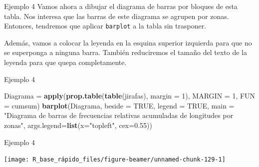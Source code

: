\documentclass[
  ignorenonframetext,
  aspectratio=169]{beamer}
\newenvironment{Shaded}{\begin{snugshade}}{\end{snugshade}}
\newcommand{\AttributeTok}[1]{\textcolor[rgb]{0.13,0.29,0.53}{#1}}
\newcommand{\ConstantTok}[1]{\textcolor[rgb]{0.56,0.35,0.01}{#1}}
\newcommand{\DecValTok}[1]{\textcolor[rgb]{0.00,0.00,0.81}{#1}}
\newcommand{\FloatTok}[1]{\textcolor[rgb]{0.00,0.00,0.81}{#1}}
\newcommand{\FunctionTok}[1]{\textcolor[rgb]{0.13,0.29,0.53}{\textbf{#1}}}
\newcommand{\NormalTok}[1]{#1}
\newcommand{\OtherTok}[1]{\textcolor[rgb]{0.56,0.35,0.01}{#1}}
\newcommand{\StringTok}[1]{\textcolor[rgb]{0.31,0.60,0.02}{#1}}
\begin{document}
\begin{frame}[fragile]{Ejemplo 4}
\label{ejemplo-4-5}
Vamos ahora a dibujar el diagrama de barras por bloques de esta tabla.
Nos interesa que las barras de este diagrama se agrupen por zonas.
Entonces, tendremos que aplicar \texttt{barplot} a la tabla sin
trasponer.

Además, vamos a colocar la leyenda en la esquina superior izquierda para
que no se superponga a ninguna barra. También reduciremos el tamaño del
texto de la leyenda para que quepa completamente.
\end{frame}

\begin{frame}[fragile]{Ejemplo 4}
\label{ejemplo-4-6}
\begin{Shaded}
\begin{Highlighting}[]
\NormalTok{Diagrama }\OtherTok{=} \FunctionTok{apply}\NormalTok{(}\FunctionTok{prop.table}\NormalTok{(}\FunctionTok{table}\NormalTok{(jirafas), }\AttributeTok{margin =} \DecValTok{1}\NormalTok{),}
                 \AttributeTok{MARGIN =} \DecValTok{1}\NormalTok{, }\AttributeTok{FUN =}\NormalTok{ cumsum)}
\FunctionTok{barplot}\NormalTok{(Diagrama, }\AttributeTok{beside =} \ConstantTok{TRUE}\NormalTok{, }\AttributeTok{legend =} \ConstantTok{TRUE}\NormalTok{,}
\AttributeTok{main =} \StringTok{"Diagrama de barras de frecuencias relativas acumuladas }
\StringTok{        de longitudes por zonas"}\NormalTok{,}
\AttributeTok{args.legend=}\FunctionTok{list}\NormalTok{(}\AttributeTok{x=}\StringTok{"topleft"}\NormalTok{, }\AttributeTok{cex=}\FloatTok{0.55}\NormalTok{))}
\end{Highlighting}
\end{Shaded}
\end{frame}

\begin{frame}{Ejemplo 4}
\label{ejemplo-4-7}
\begin{center}\texttt{[image: R\_base\_rápido\_files/figure-beamer/unnamed-chunk-129-1]} \end{center}
\end{frame}
\end{document}
